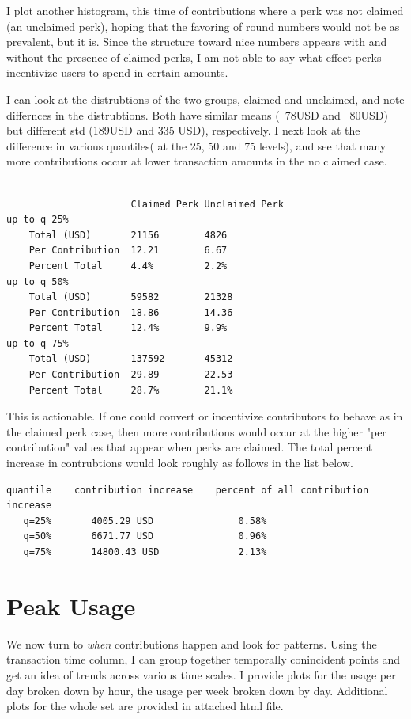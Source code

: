 \documentclass{article}[12pt]
\begin{document}
I plot another histogram, this time of contributions where a perk was not claimed (an unclaimed perk), hoping that the favoring of round numbers would not be as prevalent, but it is. Since
the structure toward nice numbers appears with and without the presence of claimed perks, I
am not able to say what effect perks incentivize users to spend in certain amounts.

\noindent
I can look at the distrubtions of the two groups, claimed and unclaimed, and note differnces in
the distrubtions. Both have similar means (~78USD and ~80USD) but different std (189USD and 335
USD), respectively. I next look at the difference in various quantiles( at the 25, 50 and 75 levels), and see that many more contributions occur at lower transaction amounts in the no
claimed case. 

\begin{verbatim}

                      Claimed Perk Unclaimed Perk
up to q 25%
    Total (USD)       21156        4826
    Per Contribution  12.21        6.67
    Percent Total     4.4%         2.2%
up to q 50%
    Total (USD)       59582        21328
    Per Contribution  18.86        14.36
    Percent Total     12.4%        9.9%
up to q 75%
    Total (USD)       137592       45312
    Per Contribution  29.89        22.53
    Percent Total     28.7%        21.1%

\end{verbatim}

This is actionable. If one could convert or incentivize contributors to behave as in the
claimed perk case, then more contributions would occur at the higher "per contribution"
values that appear when perks are claimed. The total percent increase in contrubtions
would look roughly as follows in the list below.

\begin{verbatim}
quantile    contribution increase    percent of all contribution increase
   q=25%       4005.29 USD               0.58%
   q=50%       6671.77 USD               0.96%
   q=75%       14800.43 USD              2.13%
\end{verbatim}

\section{Peak Usage}
We now turn to {\em when} contributions happen and look for patterns. Using the transaction
time column, I can group together temporally conincident points and get an idea of
trends across various time scales. I provide plots for the usage per day broken down by hour,
the usage per week broken down by day. Additional plots for the whole set are provided in
attached html file.
\end{document}
